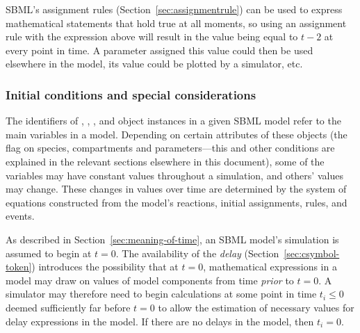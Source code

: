SBML's assignment rules (Section~\ref{sec:assignmentrule}) can be
used to express mathematical statements that hold true at all
moments, so using an assignment rule with the expression above
will result in the value being equal to $t - 2$ at every point in
time.  A parameter assigned this value could then be used
elsewhere in the model, its value could be plotted by a simulator,
etc.


\subsubsection{Initial conditions and special considerations}
\label{sec:before-t0}

The identifiers of \Species, \Compartment, \Parameter, and
\Reaction object instances in a given SBML model refer to the main
variables in a model.  Depending on certain attributes of these
objects (\eg the  flag on species, compartments
and parameters---this and other conditions are explained in the
relevant sections elsewhere in this document), some of the
variables may have constant values throughout a simulation, and
others' values may change.  These changes in values over time are
determined by the system of equations constructed from the model's
reactions, initial assignments, rules, and events.

As described in Section~\ref{sec:meaning-of-time}, an SBML model's
simulation is assumed to begin at $t = 0$.  The availability of
the \emph{delay}  (Section~\ref{sec:csymbol-token})
introduces the possibility that at $t = 0$, mathematical
expressions in a model may draw on values of model components from
time \emph{prior} to $t = 0$.  A simulator may therefore need to
begin calculations at some point in time $t_i \leq 0$ deemed
sufficiently far before $t = 0$ to allow the estimation of
necessary values for delay expressions in the model.  If there are
no delays in the model, then $t_i = 0$.

